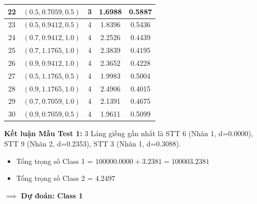 \documentclass[12pt,a4paper]{article}
\begin{document}
\begin{table}[H]
\begin{tabular}{|c|c|c|c|c|}
22 & $(0.5, 0.7059, 0.5)$ & 3 & 1.6988 & 0.5887 \\ \hline
23 & $(0.5, 0.9412, 0.5)$ & 4 & 1.8396 & 0.5436 \\ \hline
24 & $(0.7, 0.9412, 1.0)$ & 4 & 2.2526 & 0.4439 \\ \hline
25 & $(0.7, 1.1765, 1.0)$ & 4 & 2.3839 & 0.4195 \\ \hline
26 & $(0.9, 0.9412, 1.0)$ & 4 & 2.3652 & 0.4228 \\ \hline
27 & $(0.5, 1.1765, 0.5)$ & 4 & 1.9983 & 0.5004 \\ \hline
28 & $(0.9, 1.1765, 1.0)$ & 4 & 2.4906 & 0.4015 \\ \hline
29 & $(0.7, 0.7059, 1.0)$ & 4 & 2.1391 & 0.4675 \\ \hline
30 & $(0.9, 0.7059, 0.5)$ & 4 & 1.9611 & 0.5099 \\ \hline
\end{tabular}
\end{table}

\textbf{Kết luận Mẫu Test 1:} 3 Láng giềng gần nhất là STT 6 (Nhãn 1, d=0.0000), STT 9 (Nhãn 2, d=0.2353), STT 3 (Nhãn 1, d=0.3088).
\begin{itemize}
    \item Tổng trọng số Class 1 = $100000.0000 + 3.2381 = 100003.2381$
    \item Tổng trọng số Class 2 = $4.2497$
\end{itemize}
$\implies$ \textbf{Dự đoán: Class 1}
\end{document}
